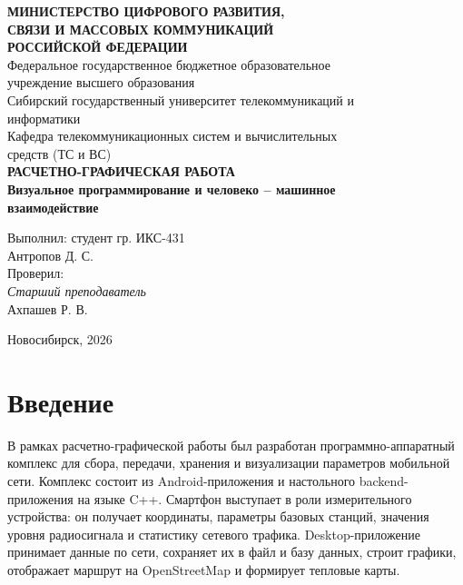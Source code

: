 \documentclass[14pt,a4paper]{extarticle}
\begin{document}
\begin{titlepage}
\thispagestyle{plain}
\begin{center}
    {\bfseries МИНИСТЕРСТВО ЦИФРОВОГО РАЗВИТИЯ,\\
    СВЯЗИ И МАССОВЫХ КОММУНИКАЦИЙ\\
    РОССИЙСКОЙ ФЕДЕРАЦИИ}\\[1.0cm]

    Федеральное государственное бюджетное образовательное\\
    учреждение высшего образования\\[0.8cm]

    Сибирский государственный университет телекоммуникаций и\\
    информатики\\[0.8cm]

    Кафедра телекоммуникационных систем и вычислительных\\
    средств (ТС и ВС)\\[4.0cm]

    {\bfseries\Large РАСЧЕТНО-ГРАФИЧЕСКАЯ РАБОТА}\\[0.35cm]
    {\bfseries Визуальное программирование и человеко -- машинное\\
    взаимодействие}\\[2.0cm]
\end{center}

\begin{flushright}
    Выполнил: студент гр. ИКС-431\\
    Антропов Д. С.\\
    Проверил:\\
    \textit{Старший преподаватель}\\
    Ахпашев Р. В.
\end{flushright}

\vfill
\begin{center}
    Новосибирск, 2026
\end{center}
\end{titlepage}

\tableofcontents
\newpage

\section{Введение}

В рамках расчетно-графической работы был разработан программно-аппаратный комплекс для сбора, передачи, хранения и визуализации параметров мобильной сети. Комплекс состоит из Android-приложения и настольного backend-приложения на языке C++. Смартфон выступает в роли измерительного устройства: он получает координаты, параметры базовых станций, значения уровня радиосигнала и статистику сетевого трафика. Desktop-приложение принимает данные по сети, сохраняет их в файл и базу данных, строит графики, отображает маршрут на OpenStreetMap и формирует тепловые карты.
\end{document}
